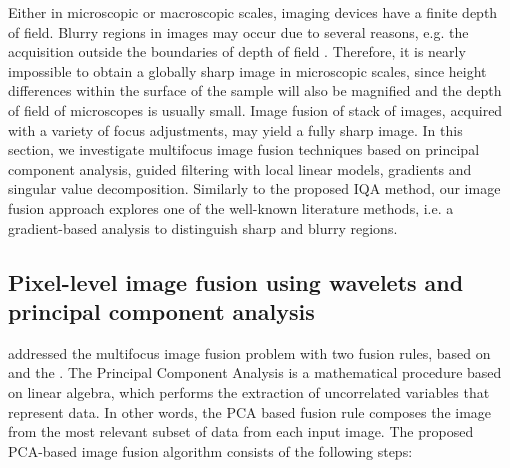 Either in microscopic or macroscopic scales, imaging devices have a finite depth of field. Blurry regions in images may occur due to several reasons, e.g. the acquisition outside the boundaries of depth of field \cite{huang2007evaluation}. Therefore, it is nearly impossible to obtain a globally sharp image in microscopic scales, since height differences within the surface of the sample will also be magnified and the depth of field of microscopes is usually small. Image fusion of stack of images, acquired with a variety of focus adjustments, may yield a fully sharp image. In this section, we investigate multifocus image fusion techniques based on principal component analysis, guided filtering with local linear models, gradients and singular value decomposition. Similarly to the proposed IQA method, our image fusion approach explores one of the well-known literature methods, i.e. a gradient-based analysis to distinguish sharp and blurry regions.

\subsection{Pixel-level image fusion using wavelets and principal component analysis}

 addressed the multifocus image fusion problem with two fusion rules, based on  and the . The Principal Component Analysis is a mathematical procedure based on linear algebra, which performs the extraction of uncorrelated variables that represent data. In other words, the PCA based fusion rule composes the image from the most relevant subset of data from each input image. The proposed PCA-based image fusion algorithm consists of the following steps:

